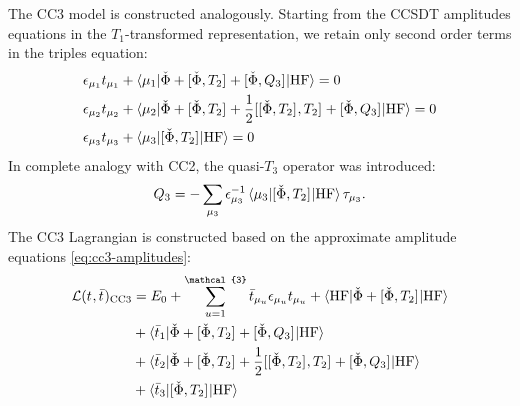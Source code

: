 The \gls{CC3} model is constructed analogously. Starting from the
\acrshort*{CCSDT} amplitudes equations in the $T_1$-transformed
representation, we retain only second order terms in the triples
equation:\autocite{Christiansen1995-pv, Koch1997-nm, Helgaker2000-tz,
Smith2005-an}
\begin{subequations}\label{eq:cc3-amplitudes}
  \begin{align}
    \epsilon_{\mu_1}t_{\mu_1} &+ \braket{\mu_1 |
    \check{\Phi} + [ \check{\Phi}, T_2 ]^{}
    + [ \check{\Phi}, Q_3 ]^{}
    | \mathrm{HF}} = 0 \label{eq:cc3-singles-amplitudes} \\
    \epsilon_{\mu_2}t_{\mu_2} &+ \braket{\mu_2 |
    \check{\Phi} + [ \check{\Phi}, T_2 ]^{}
    + \frac{1}{2}[ [ \check{\Phi}, T_2 ]^{}, T_2 ]^{}
    + [ \check{\Phi}, Q_3 ]^{}
    | \mathrm{HF}} = 0 \label{eq:cc3-doubles-amplitudes} \\
    \epsilon_{\mu_3}t_{\mu_3} &+ \braket{\mu_3 |
    [ \check{\Phi}, T_2 ]^{}
    | \mathrm{HF}} = 0 \label{eq:cc3-triples-amplitudes}
  \end{align}
\end{subequations}
In complete analogy with \acrshort*{CC2}, the quasi-$T_3$ operator was introduced:
\begin{equation}
  Q_3 = - \sum_{\mu_3}
  \epsilon_{\mu_3}^{-1}\braket{\mu_3 | [ \check{\Phi}, T_2 ]^{} | \mathrm{HF}}\tau_{\mu_3}.
\end{equation}
The \acrshort*{CC3} Lagrangian is constructed based on the approximate
amplitude equations
\eqref{eq:cc3-amplitudes}:\autocite{Christiansen1995-pv, Koch1997-nm,
Helgaker2000-tz, Smith2005-an}
\begin{equation}\label{eq:cc3-lagrangian}
  \begin{aligned}
  \mathcal{L}(\tamp{}, \tbar{})_\mathrm{CC3}
  &=
  E_0
  + \sum_{u=1}^{\mathcal{3}}\tbar{\mu_u}\denom{\mu_u}\tamp{\mu_u}
  + \braket{\mathrm{HF} | \check{\Phi} + \commutator{\check{\Phi}}{T_2} | \mathrm{HF}} \\
  &+ \braket{\tbar{1} |
  \check{\Phi} + \commutator{\check{\Phi}}{T_2} + \commutator{\check{\Phi}}{Q_3}
  | \mathrm{HF}} \\
  &+ \braket{\tbar{2} |
  \check{\Phi} + \commutator{\check{\Phi}}{T_2}
  + \frac{1}{2}\commutator{\commutator{\check{\Phi}}{T_2}}{T_2} + \commutator{\check{\Phi}}{Q_3}
  | \mathrm{HF}} \\
  &+ \braket{\tbar{3} | \commutator{\check{\Phi}}{T_2} | \mathrm{HF}}
  \end{aligned}
\end{equation}
